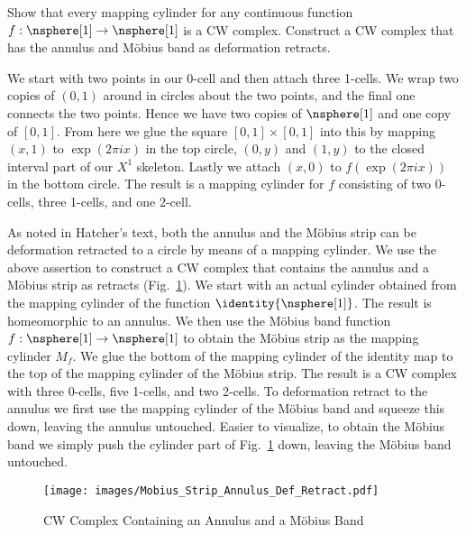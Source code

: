 \documentclass{book}                                                           %
\begin{document}
\begin{problem}
    Show that every mapping cylinder for any continuous function
    $f:\nsphere[1]\rightarrow\nsphere[1]$ is a CW complex. Construct a
    CW complex that has the annulus and M\"{o}bius band as deformation
    retracts.
\end{problem}
\begin{solution}
    We start with two points in our 0-cell and then attach three 1-cells.
    We wrap two copies of $(0,1)$ around in circles about the two points,
    and the final one connects the two points. Hence we have two copies of
    $\nsphere[1]$ and one copy of $[0,1]$. From here we glue the square
    $[0,1]\times[0,1]$ into this by mapping $(x,1)$ to $\exp(2\pi{i}x)$ in
    the top circle, $(0,y)$ and $(1,y)$ to the closed interval part of our
    $X^{1}$ skeleton. Lastly we attach $(x,0)$ to $f(\exp(2\pi{i}x))$ in
    the bottom circle. The result is a mapping cylinder for $f$ consisting
    of two 0-cells, three 1-cells, and one 2-cell.
    \par\hfill\par
    As noted in Hatcher's text, both the annulus and the M\"{o}bius strip
    can be deformation retracted to a circle by means of a mapping cylinder.
    We use the above assertion to construct a CW complex that contains the
    annulus and a M\"{o}bius strip as retracts
    (Fig.~\ref{fig:CW_Comp_Annulus_Mobius}). We start with an actual
    cylinder obtained from the mapping cylinder of the function
    $\identity{\nsphere[1]}$. The result is homeomorphic to an annulus. We
    then use the M\"{o}bius band function
    $f:\nsphere[1]\rightarrow\nsphere[1]$ to obtain the M\"{o}bius strip as
    the mapping cylinder $M_{f}$. We glue the bottom of the mapping cylinder
    of the identity map to the top of the mapping cylinder of the M\"{o}bius
    strip. The result is a CW complex with three 0-cells, five 1-cells, and
    two 2-cells. To deformation retract to the annulus we first use the
    mapping cylinder of the M\"{o}bius band and squeeze this down, leaving
    the annulus untouched. Easier to visualize, to obtain the M\"{o}bius
    band we simply push the cylinder part of
    Fig.~\ref{fig:CW_Comp_Annulus_Mobius} down, leaving the M\"{o}bius band
    untouched.
\end{solution}
\begin{figure}[H]
    \centering
    \captionsetup{type=figure}
    \texttt{[image: images/Mobius\_Strip\_Annulus\_Def\_Retract.pdf]}
    \caption{CW Complex Containing an Annulus and a M\"{o}bius Band}
    \label{fig:CW_Comp_Annulus_Mobius}
\end{figure}
\end{document}
